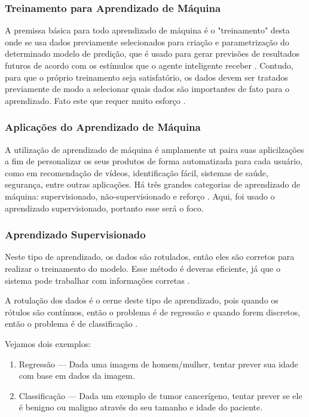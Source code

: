 \subsubsection{Treinamento para Aprendizado de Máquina}

A premissa básica para todo aprendizado de máquina é o "treinamento" desta onde se usa dados previamente selecionados para criação e parametrização do determinado modelo de predição, que é usado para gerar previsões de resultados futuros de acordo com os estímulos que o agente inteligente receber \cite{russell2002artificial}. Contudo, para que o próprio treinamento seja satisfatório, os dados devem ser tratados previamente de modo a selecionar quais dados são importantes de fato para o aprendizado. Fato este que requer muito esforço \cite{russell2002artificial}.

\subsubsection{Aplicações do Aprendizado de Máquina}

A utilização de aprendizado de máquina é amplamente ut paira suas aplicilzações a fim de personalizar os seus produtos de forma automatizada para cada usuário, como em recomendação de vídeos, identificação fácil, sistemas de saúde, segurança, entre outras aplicações. Há três grandes categorias de aprendizado de máquina: supervisionado, não-supervisionado e reforço \cite{russell2002artificial}. Aqui, foi usado o aprendizado supervisionado, portanto esse será o foco.

\subsubsection{Aprendizado Supervisionado}

Neste tipo de aprendizado, os dados são rotulados, então eles são corretos para realizar o treinamento do modelo. Esse método é deveras eficiente, já que o sistema pode trabalhar com informações corretas \cite{russell2002artificial}. 

A rotulação dos dados é o cerne deste tipo de aprendizado, pois quando os rótulos são contínuos, então o problema é de regressão e quando forem discretos, então o problema é de classificação \cite{russell2002artificial}.

Vejamos dois exemplos:
\begin{enumerate}
    \item Regressão — Dada uma imagem de homem/mulher, tentar prever sua idade com base em dados da imagem.
    \item Classificação — Dada um exemplo de tumor cancerígeno, tentar prever se ele é benigno ou maligno através do seu tamanho e idade do paciente.
\end{enumerate}


